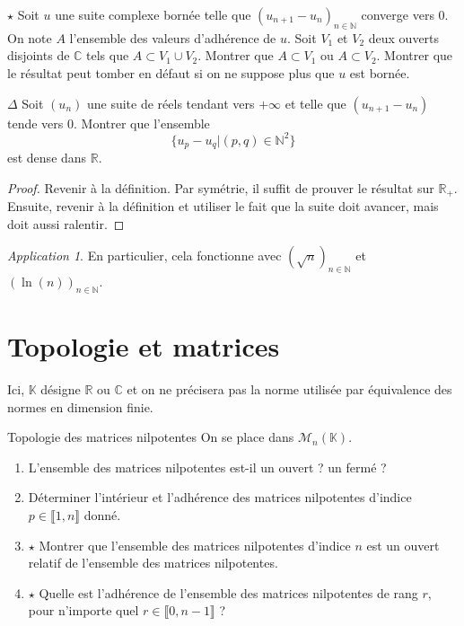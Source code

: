 \documentclass[french,a4paper]{article}
\newcommand{\N}{\mathbb{N}}
\newcommand{\R}{\mathbb{R}}
\newcommand{\C}{\mathbb{C}}
\newcommand{\K}{\mathbb{K}}
\theoremstyle{plain}
\theoremstyle{definition}
\theoremstyle{remark}
\newtheorem*{app}{Application}
\begin{document}
\begin{ex}{$\star$}
	Soit $u$ une suite complexe bornée telle que $(u_{n+1}-u_n)_{n\in\N}$ converge vers $0$. On note $A$ l'ensemble des valeurs d'adhérence de $u$. Soit $V_1$ et $V_2$ deux ouverts disjoints de $\C$ tels que $A\subset V_1\cup V_2$. Montrer que $A\subset V_1$ ou $A\subset V_2$. Montrer que le résultat peut tomber en défaut si on ne suppose plus que $u$ est bornée.
\end{ex}

\begin{ex}{$\Delta$}
	Soit $(u_n)$ une suite de réels tendant vers $+\infty$ et telle que $(u_{n+1}-u_n)$ tende vers $0$. Montrer que l'ensemble $$\{u_p-u_q|(p,q)\in\N^2\}$$ est dense dans $\R$.
\end{ex}
\begin{proof}
	Revenir à la définition. Par symétrie, il suffit de prouver le résultat sur $\R_+$. Ensuite, revenir à la définition et utiliser le fait que la suite doit avancer, mais doit aussi ralentir.
\end{proof}
\begin{app}
	En particulier, cela fonctionne avec $(\sqrt{n})_{n\in\N}$ et $(\ln(n))_{n\in\N}$.
\end{app}

\section{Topologie et matrices}

Ici, $\K$ désigne $\R$ ou $\C$ et on ne précisera pas la norme utilisée par équivalence des normes en dimension finie.

\begin{ex}{Topologie des matrices nilpotentes}
	On se place dans $\mathcal{M}_n(\K)$.
	\begin{enumerate}
		\item L'ensemble des matrices nilpotentes est-il un ouvert ? un fermé ?
		\item Déterminer l'intérieur et l'adhérence des matrices nilpotentes d'indice $p\in\llbracket1,n\rrbracket$ donné.
		\item $\star$ Montrer que l'ensemble des matrices nilpotentes d'indice $n$ est un ouvert relatif de l'ensemble des matrices nilpotentes.
		\item $\star$ Quelle est l'adhérence de l'ensemble des matrices nilpotentes de rang $r$, pour n'importe quel $r\in\llbracket0,n-1\rrbracket$ ?
	\end{enumerate}
\end{ex}
\end{document}
